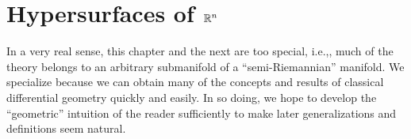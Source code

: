 \documentclass[../main]{subfiles}
\begin{document}
\chapter{Hypersurfaces of \texorpdfstring{$\mathbb{R}^n$}{R^n}}\label{ch02}
In a very real sense, this chapter and the next are too special, i.e.,, much of the theory belongs to an arbitrary submanifold of a ``semi-Riemannian'' manifold. We specialize because we can obtain many of the concepts and results of classical differential geometry quickly and easily. In so doing, we hope to develop the ``geometric'' intuition of the reader sufficiently to make later generalizations and definitions seem natural.








\end{document}
